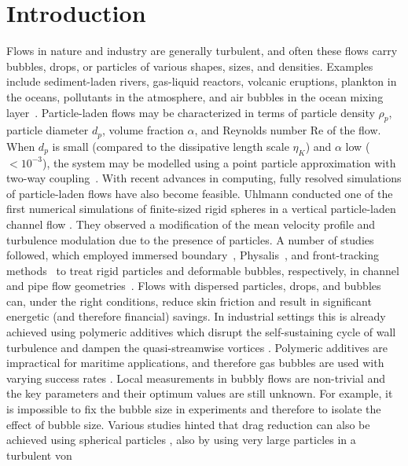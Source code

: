 \section{Introduction}
Flows in nature and industry are generally turbulent, and often these flows
carry bubbles, drops, or particles of various shapes, sizes, and densities.
Examples include sediment-laden rivers, gas-liquid reactors, volcanic
eruptions, plankton in the oceans, pollutants in the atmosphere, and air
bubbles in the ocean mixing layer~\citep{Toschi2009}.  Particle-laden flows
may be characterized in terms of particle density $\rho_p$, particle diameter
$d_p$, volume fraction $\alpha$, and Reynolds number Re of the flow. When
$d_p$ is small (compared to the dissipative length scale $\eta_K$) and
$\alpha$ low ($< 10^{-3}$), the system may be modelled using a point particle
approximation with two-way
coupling~\citep{Elghobashi1994,Mazzitelli2003,Mathai2016}.  With recent
advances in computing, fully resolved simulations of particle-laden flows have
also become feasible.  Uhlmann conducted one of the first numerical
simulations of finite-sized rigid spheres in a vertical particle-laden channel
flow \citep{Uhlmann2008}.  They observed a modification of the mean velocity
profile and turbulence modulation due to the presence of particles. A number
of studies followed, which employed immersed
boundary~\citep{Peskin2002,Cisse2013}, Physalis~\citep{Naso2010, Wang2017b},
and front-tracking methods~\citep{Unverdi1992,Roghair2011,Tagawa2013} to treat
rigid particles and deformable bubbles, respectively, in channel and pipe flow
geometries~\citep{Pan1996,Lu2005,Uhlmann2008,Dabiri2013,Kidanemariam2013,Lashgari2014,Picano2015,Costa2016}. 
Flows with dispersed particles, drops, and bubbles can, under the right
conditions, reduce skin friction and result in significant energetic (and
therefore financial) savings. In industrial settings this is already achieved
using polymeric additives which disrupt the self-sustaining cycle of wall
turbulence and dampen the quasi-streamwise vortices
\citep{White2008,Procaccia2008}. Polymeric additives are impractical for
maritime applications, and therefore gas bubbles are used with varying success
rates \citep{Ceccio2010,Murai2014}. Local measurements in bubbly flows are
non-trivial and the key parameters and their optimum values are still unknown.
For example, it is impossible to fix the bubble size in experiments and
therefore to isolate the effect of bubble size. Various studies hinted that
drag reduction can also be achieved using spherical particles
\citep{Zhao2010}, also by using very large particles in a turbulent von
